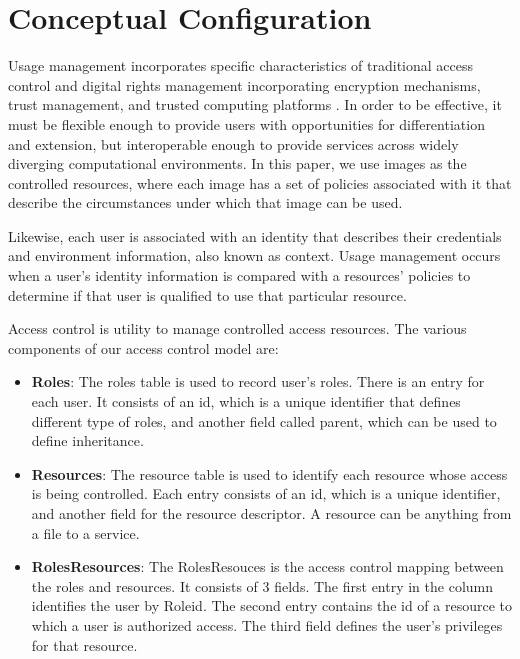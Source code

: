 \documentclass{sig-alternate}
\begin{document}
\section{Conceptual Configuration}
Usage management incorporates specific characteristics of traditional access control and digital rights management incorporating encryption mechanisms, trust management, and trusted computing platforms \cite{Jamkhedkar:2010:IUM:1866870.1866885}.  In order to be effective, it must be flexible enough to provide users with opportunities for differentiation and extension, but interoperable enough to provide services across widely diverging computational environments.  In this paper, we use images as the controlled resources, where each image has a set of policies associated with it that describe the circumstances under which that image can be used.

Likewise, each user is associated with an identity that describes their credentials and environment information, also known as context. Usage management occurs when a user's identity information is compared with a resources' policies to determine if that user is qualified to use that particular resource.

Access control is utility to manage controlled access resources.  The various components of our access control model are:
\begin{itemize}

\item \textbf{Roles}: The roles table is used to record user's roles. There is an entry for each user. It consists of an id, which is a unique identifier that defines different type of roles, and another field called parent, which can be used to define inheritance.

\item \textbf{Resources}: The resource table is used to identify each resource whose access is being controlled. Each entry consists of an id, which is a unique identifier, and another field for the resource descriptor. A resource can be anything from a file to a service.

\item \textbf{RolesResources}: The RolesResouces is the access control mapping between the roles and resources. It consists of 3 fields. The first entry in the column identifies the user by Roleid. The second entry contains the id of a resource to which a user is authorized access. The third field defines the user's privileges for that resource.

\end{itemize} 
\end{document}
